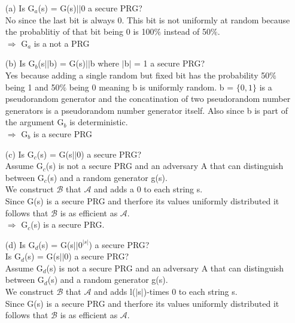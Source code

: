
\begin{itemize}
\item[(a)]
	Is G\(_{a}\)(s) = G(s)\(\vert \vert\)0 a secure PRG? \\
	No since the last bit is always 0. This bit is not uniformly at random because the probablitiy of that bit being 0 is 100\(\%\) instead of 50\(\%\). \\
	\(\Rightarrow\)  G\(_{a}\) is a not a PRG
\item[(b)]
	Is G\(_{b}\)(s\(\vert \vert\)b) = G(s)\(\vert \vert\)b where \(\vert\)b\(\vert\) = 1 a secure PRG? \\
	Yes because adding a single random but fixed bit has the probability 50\(\%\) being 1 and  50\(\%\) being 0 meaning b is uniformly random.
	b = \(\{0,1\}\) is a pseudorandom generator and the concatination of two pseudorandom number generators is a pseudorandom number generator itself.
	Also since b is part of the argument G\(_{b}\) is deterministic. \\
	\(\Rightarrow\)  G\(_{b}\) is a secure PRG\\
\item[(c)]
	Is G\(_{c}\)(s) = G(s\(\vert \vert\)0) a secure PRG? \\
	Assume  G\(_{c}\)(s)  is not a secure PRG and an adversary A that can distinguish between  G\(_{c}\)(s) and a random generator g(s).\\
	We construct \(\mathcal{B}\) that \(\mathcal{A}\)  and adds a 0 to each string s.\\
	Since G(s) is a secure PRG and therfore its values uniformly distributed it follows that \(\mathcal{B}\) is as efficient as \(\mathcal{A}\).\\
	\(\Rightarrow\) G\(_{c}\)(s) is a secure PRG.
\item[(d)]
	Is G\(_{d}\)(s) = G(s\(\vert \vert\)\(0^{\vert s \vert}\)) a secure PRG? \\
	Is G\(_{d}\)(s) = G(s\(\vert \vert\)0) a secure PRG? \\
	Assume  G\(_{d}\)(s)  is not a secure PRG and an adversary A that can distinguish between  G\(_{d}\)(s) and a random generator g(s).\\
	We construct \(\mathcal{B}\) that \(\mathcal{A}\)  and adds l(\(\vert\)s\(\vert\))-times 0 to each string s.\\
	Since G(s) is a secure PRG and therfore its values uniformly distributed it follows that \(\mathcal{B}\) is as efficient as \(\mathcal{A}\).\\

\end{itemize}
